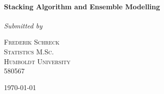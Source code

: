 \documentclass[12pt]{article}
\begin{document}
\begin{titlepage}
	\center
	\HRule\\[0.4cm]
	
	{\Large\bfseries Stacking Algorithm and Ensemble Modelling}\\[0.05cm] %
		\HRule\\[1.5cm]
	
			
			\textit{Submitted by}\\	
			\vspace{0.5cm}
			

	\begin{minipage}{0.5\textwidth}
		\begin{center}
			\large

			\textsc{Frederik Schreck \\
			Statistics M.Sc.\\
			Humboldt University\\
			580567} %
		\end{center}

	\end{minipage}
	

	\vfill\vfill\vfill\vfill %
	
	{\large\today} %
	
	\vfill %
	
\end{titlepage}


\tableofcontents
\thispagestyle{empty}
\clearpage
\setcounter{page}{1}
\newpage

\listoffigures
\listoftables
\listofalgorithms

\thispagestyle{empty}
\clearpage
\setcounter{page}{1}




\begin{minipage}{1\textwidth}
\vspace{1.5cm}
\end{minipage}
\end{document}
